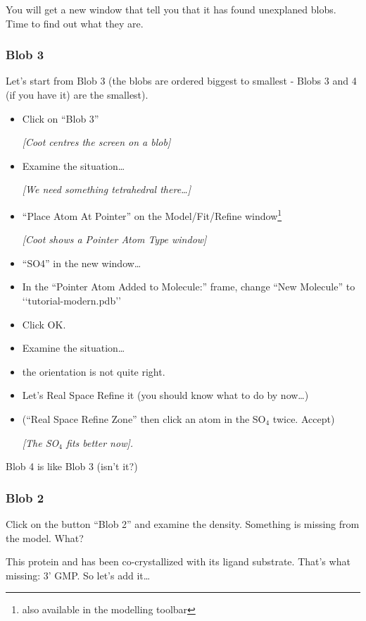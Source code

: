 \documentclass{article}
\begin{document}
You will get a new window that tell you that it has found unexplaned
blobs.  Time to find out what they are.

\subsubsection{Blob 3}
Let's start from Blob 3 (the blobs are ordered biggest to smallest -
Blobs 3 and 4 (if you have it) are the smallest).

\begin{itemize}
\item Click on ``Blob 3''

\textsl{ [Coot centres the screen on a blob]}

\item Examine the situation\ldots

  \emph{[We need something tetrahedral there\ldots]}
  
\item \textsf{``Place Atom At Pointer''} on the Model/Fit/Refine
  window\footnote{also available in the modelling toolbar}

\textsl{ [Coot shows a Pointer Atom Type window]}

\item \textsf{``SO4''} in the new window\ldots
\item In the ``Pointer Atom Added to Molecule:'' frame, change ``New
  Molecule'' to `\textsf{`tutorial-modern.pdb''}
\item Click \textsf{OK}.
\item Examine the situation\ldots
\item the orientation is not quite right.
\item Let's Real Space Refine it (you should know what to do by now\ldots)
\item (\textsf{``Real Space Refine Zone''} then click an atom in the
  SO$_4$ twice.  Accept)

\textsl{[The SO$_4$ fits better now].}

\end{itemize}

Blob 4 is like Blob 3 (isn't it?)

\subsubsection{Blob 2}
Click on the button \textsf{``Blob 2''} and examine the density.
Something is missing from the model.  What?

This protein and has been co-crystallized with its ligand substrate.
That's what missing: 3' GMP.  So let's add it\ldots
\end{document}
